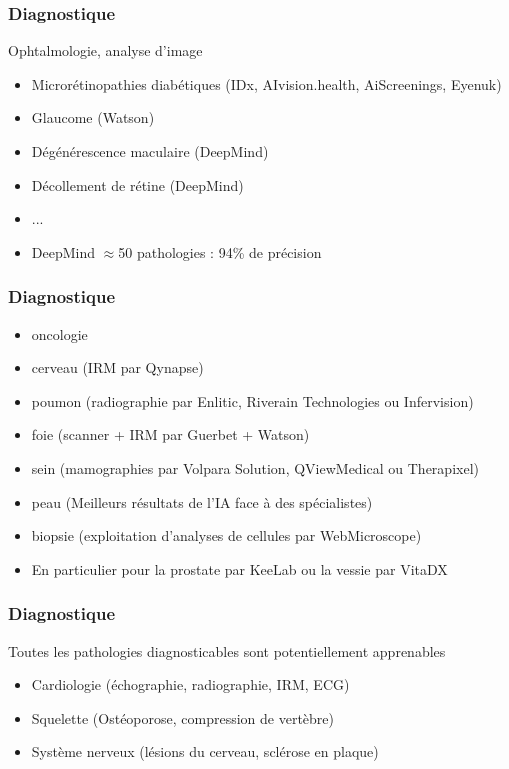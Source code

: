 \begin{frame}
  \frametitle{Diagnostique}
  Ophtalmologie, analyse d'image
  \newline
  \newline
  \begin{minipage}[c]{0.65\linewidth}
    \begin{itemize}
    \item Microrétinopathies diabétiques (IDx, AIvision.health, AiScreenings, Eyenuk)
    \item Glaucome (Watson)
    \item Dégénérescence maculaire (DeepMind)
    \item Décollement de rétine (DeepMind)
    \item ...
    \item DeepMind $\approx$50 pathologies : 94\% de précision
    \end{itemize}
  \end{minipage}\hfill
  \begin{minipage}[c]{0.34\linewidth}
  \end{minipage}\hfill
\end{frame}

\begin{frame}
  \frametitle{Diagnostique}
  \begin{itemize}
  \item oncologie
  \item cerveau (IRM par Qynapse)
  \item poumon (radiographie par Enlitic, Riverain Technologies ou Infervision)
  \item foie (scanner + IRM par Guerbet + Watson)
  \item sein (mamographies par Volpara Solution, QViewMedical ou Therapixel)
  \item peau (Meilleurs résultats de l'IA face à des spécialistes)
  \item biopsie (exploitation d'analyses de cellules par WebMicroscope)
  \item En particulier pour la prostate par KeeLab ou la vessie par VitaDX
  \end{itemize}
\end{frame}

\begin{frame}
  \frametitle{Diagnostique}
  Toutes les pathologies diagnosticables sont potentiellement apprenables
    \begin{itemize}
    \item Cardiologie (échographie, radiographie, IRM, ECG)
    \item Squelette (Ostéoporose, compression de vertèbre)
    \item Système nerveux (lésions du cerveau, sclérose en plaque)
    \end{itemize}
\end{frame}

